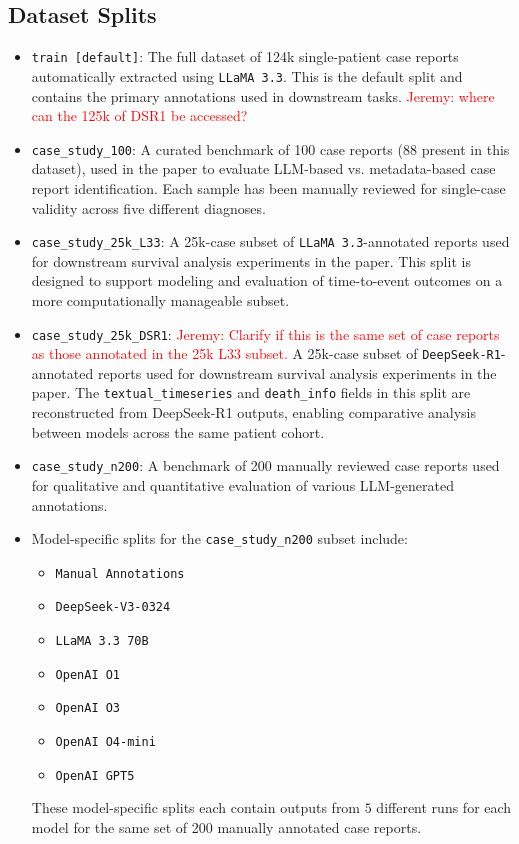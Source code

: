 \subsection{Dataset Splits}
\begin{itemize}
    \item \texttt{train [default]}: The full dataset of 124k single-patient case reports automatically extracted using \texttt{LLaMA 3.3}. This is the default split and contains the primary annotations used in downstream tasks. \textcolor{red}{Jeremy: where can the 125k of DSR1 be accessed?}
    \item \texttt{case\_study\_100}: A curated benchmark of 100 case reports (88 present in this dataset), used in the paper to evaluate LLM-based vs. metadata-based case report identification. Each sample has been manually reviewed for single-case validity across five different diagnoses.
    \item \texttt{case\_study\_25k\_L33}: A 25k-case subset of \texttt{LLaMA 3.3}-annotated reports used for downstream survival analysis experiments in the paper. This split is designed to support modeling and evaluation of time-to-event outcomes on a more computationally manageable subset.
    \item \texttt{case\_study\_25k\_DSR1}: \textcolor{red}{Jeremy: Clarify if this is the same set of case reports as those annotated in the 25k L33 subset.} 
    A 25k-case subset of \texttt{DeepSeek-R1}-annotated reports used for downstream survival analysis experiments in the paper. The \texttt{textual\_timeseries} and \texttt{death\_info} fields in this split are reconstructed from DeepSeek-R1 outputs, enabling comparative analysis between models across the same patient cohort.
    \item \texttt{case\_study\_n200}: A benchmark of 200 manually reviewed case reports used for qualitative and quantitative evaluation of various LLM-generated annotations.
    \item Model-specific splits for the \texttt{case\_study\_n200} subset include:
    \begin{itemize}
        \item \texttt{Manual Annotations}
        \item \texttt{DeepSeek-V3-0324}
        \item \texttt{LLaMA 3.3 70B}
        \item \texttt{OpenAI O1}
        \item \texttt{OpenAI O3}
        \item \texttt{OpenAI O4-mini}
        \item \texttt{OpenAI GPT5}
    \end{itemize}
    These model-specific splits each contain outputs from $5$ different runs for each model for the same set of 200 manually annotated case reports.
\end{itemize}

